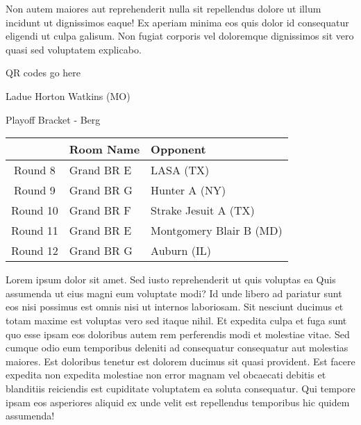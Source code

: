 \documentclass{article}%
\begin{document}
\newline%
Non autem maiores aut reprehenderit nulla sit repellendus dolore ut illum incidunt ut dignissimos eaque! Ex aperiam minima eos quis dolor id consequatur eligendi ut culpa galisum. Non fugiat corporis vel doloremque dignissimos sit vero quasi sed voluptatem explicabo.\newline%
\newline%
%
\vspace*{30pt}%
\begin{center}%
\begin{Huge}%
QR codes go here%
\end{Huge}%
\end{center}%
\newpage%
\begin{center}%
\begin{Huge}%
Ladue Horton Watkins (MO)%
\end{Huge}%
\vspace*{8pt}%
\linebreak%
\begin{Large}%
Playoff Bracket {-} Berg%
\end{Large}%
\end{center}%
\begin{tabularx}{\textwidth}{|c|Y|Y|}%
\hline%
&Room Name&Opponent\\%
\hline%
Round 8&Grand BR E&LASA (TX)\\%
Round 9&Grand BR G&Hunter A (NY)\\%
Round 10&Grand BR F&Strake Jesuit A (TX)\\%
Round 11&Grand BR E&Montgomery Blair B (MD)\\%
Round 12&Grand BR G&Auburn (IL)\\%
\hline%
\end{tabularx}%
\vspace*{8pt}%
\linebreak%
\newline%
\newline%
Lorem ipsum dolor sit amet. Sed iusto reprehenderit ut quis voluptas ea Quis assumenda ut eius magni eum voluptate modi? Id unde libero ad pariatur sunt eos nisi possimus est omnis nisi ut internos laboriosam. Sit nesciunt ducimus et totam maxime est voluptas vero sed itaque nihil. Et expedita culpa et fuga sunt quo esse ipsam eos doloribus autem rem perferendis modi et molestiae vitae.\newline%
\newline%
Sed cumque odio eum temporibus deleniti ad consequatur consequatur aut molestias maiores. Est doloribus tenetur est dolorem ducimus sit quasi provident. Est facere expedita non expedita molestiae non error magnam vel obcaecati debitis et blanditiis reiciendis est cupiditate voluptatem ea soluta consequatur. Qui tempore ipsam eos asperiores aliquid ex unde velit est repellendus temporibus hic quidem assumenda!\newline%
\end{document}
